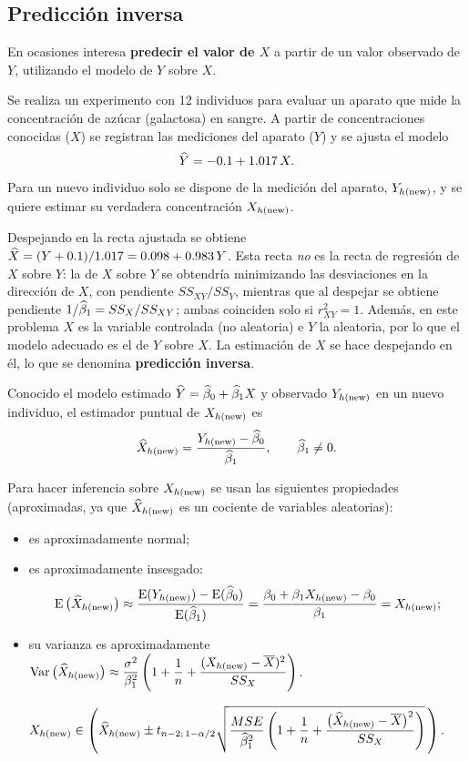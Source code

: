 \subsection{Predicción inversa}

En ocasiones interesa \textbf{predecir el valor de $X$} a partir de un valor observado de $Y$,
utilizando el modelo de $Y$ sobre $X$.

\begin{ejemplo}
  Se realiza un experimento con 12 individuos para evaluar un aparato que mide la concentración
  de azúcar (galactosa) en sangre. A partir de concentraciones conocidas ($X$) se registran las
  mediciones del aparato ($Y$) y se ajusta el modelo
  \[
    \widehat{Y} = -0.1 + 1.017\,X .
  \]
  Para un nuevo individuo solo se dispone de la medición del aparato, $Y_{h(\mathrm{new})}$, y se quiere
  estimar su verdadera concentración $X_{h(\mathrm{new})}$.
\end{ejemplo}

Despejando en la recta ajustada se obtiene
$\widehat{X}=(Y+0.1)/1.017=0.098+0.983\,Y$. Esta recta \emph{no} es la recta de regresión de $X$
sobre $Y$: la de $X$ sobre $Y$ se obtendría minimizando las desviaciones en la dirección de $X$,
con pendiente $SS_{XY}/SS_Y$, mientras que al despejar se obtiene pendiente
$1/\widehat{\beta}_1=SS_X/SS_{XY}$; ambas coinciden solo si $r_{XY}^2=1$. Además, en este problema $X$
es la variable controlada (no aleatoria) e $Y$ la aleatoria, por lo que el modelo adecuado es el
de $Y$ sobre $X$. La estimación de $X$ se hace despejando en él, lo que se denomina
\textbf{predicción inversa}.

\begin{definicion}
  Conocido el modelo estimado $\widehat{Y}=\widehat{\beta}_0+\widehat{\beta}_1X$ y observado $Y_{h(\mathrm{new})}$ en un
  nuevo individuo, el estimador puntual de $X_{h(\mathrm{new})}$ es
  \[
    \widehat{X}_{h(\mathrm{new})} = \frac{Y_{h(\mathrm{new})}-\widehat{\beta}_0}{\widehat{\beta}_1}, \qquad \widehat{\beta}_1\neq0 .
  \]
\end{definicion}

Para hacer inferencia sobre $X_{h(\mathrm{new})}$ se usan las siguientes propiedades (aproximadas, ya que
$\widehat{X}_{h(\mathrm{new})}$ es un cociente de variables aleatorias):
\begin{itemize}
  \item es aproximadamente normal;
  \item es aproximadamente insesgado:
    \[
      \operatorname{E}\big(\widehat{X}_{h(\mathrm{new})}\big)\approx
      \frac{\operatorname{E}(Y_{h(\mathrm{new})})-\operatorname{E}(\widehat{\beta}_0)}{\operatorname{E}(\widehat{\beta}_1)}
      = \frac{\beta_0+\beta_1X_{h(\mathrm{new})}-\beta_0}{\beta_1} = X_{h(\mathrm{new})} ;
    \]
  \item su varianza es aproximadamente
    $\operatorname{Var}\big(\widehat{X}_{h(\mathrm{new})}\big)\approx
    \dfrac{\sigma^2}{\beta_1^2}\left(1+\dfrac1n+\dfrac{(X_{h(\mathrm{new})}-\overline{X})^2}{SS_X}\right)$.
\end{itemize}

\begin{resumen}
  \[
    X_{h(\mathrm{new})} \in \left(\widehat{X}_{h(\mathrm{new})} \pm t_{n-2;\,1-\alpha/2}
    \sqrt{\frac{MSE}{\widehat{\beta}_1^2}\left(1+\frac1n+
    \frac{\big(\widehat{X}_{h(\mathrm{new})}-\overline{X}\big)^2}{SS_X}\right)}\,\right).
  \]
\end{resumen}
